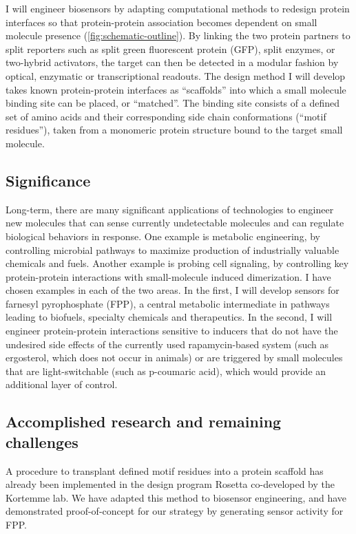 I will engineer biosensors by adapting computational methods to redesign protein interfaces so that protein-protein association becomes dependent on small molecule presence (\cref{fig:schematic-outline}).
By linking the two protein partners to split reporters such as split green fluorescent protein (GFP), split enzymes, or two-hybrid activators, the target can then be detected in a modular fashion by optical, enzymatic or transcriptional readouts.
The design method I will develop takes known protein-protein interfaces as ``scaffolds'' into which a small molecule binding site can be placed, or ``matched''.
The binding site consists of a defined set of amino acids and their corresponding side chain conformations (``motif residues''), taken from a monomeric protein structure bound to the target small molecule.

\subsection{Significance}

Long-term, there are many significant applications of technologies to engineer new molecules that can sense currently undetectable molecules and can regulate biological behaviors in response.
One example is metabolic engineering, by controlling microbial pathways to maximize production of industrially valuable chemicals and fuels.
Another example is probing cell signaling, by controlling key protein-protein interactions with small-molecule induced dimerization.
I have chosen examples in each of the two areas.
In the first, I will develop sensors for farnesyl pyrophosphate (FPP), a central metabolic intermediate in pathways leading to biofuels, specialty chemicals and therapeutics\cite{zhang_metabolic_2011}.
In the second, I will engineer protein-protein interactions sensitive to inducers that do not have the undesired side effects of the currently used rapamycin-based system\cite{gray_activation_2010} (such as ergosterol, which does not occur in animals) or are triggered by small molecules that are light-switchable (such as p-coumaric acid), which would provide an additional layer of control.

\subsection{Accomplished research and remaining challenges}

A procedure to transplant defined motif residues into a protein scaffold has already been implemented in the design program Rosetta\cite{jiang_novo_2008} co-developed by the Kortemme lab.
We have adapted this method to biosensor engineering, and have demonstrated proof-of-concept for our strategy by generating sensor activity for FPP.

